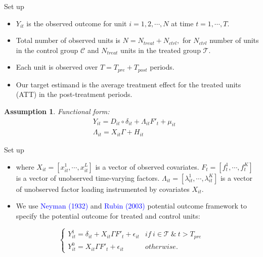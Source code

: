 \documentclass{beamer}
\newtheorem{assumption}{Assumption}
\begin{document}
\begin{frame}{Set up}
    \begin{itemize}
        \item $Y_{it}$ is the observed outcome for unit $i=1,2,\cdots, N$ at time $t=1,\cdots,T.$
        \item Total number of observed units is $N=N_{treat}+N_{ctrl},$ for $N_{ctrl}$ number of units in the control group $\mathcal{C}$ and $N_{treat}$ units in the treated group $\mathcal{T}$.
        \item Each unit is observed over $T=T_{pre}+T_{post}$ periods.
        \item Our target estimand is the average treatment effect for the treated units (ATT) in the post-treatment periods.
    \end{itemize}

\begin{assumption}
    Functional form:
    \begin{align*}
        & Y_{it} = D_{it}\circ \delta_{it} + \Lambda_{it}F'_t + \mu_{it} \\
        & \Lambda_{it} = X_{it}\Gamma + H_{it}
    \end{align*}
\end{assumption}
\end{frame}

\begin{frame}{Set up}
\begin{itemize}
    \item where $X_{it} = [x^1_{it}, \cdots, x^L_{it}]$ is a vector of observed covariates. $F_t = [f^1_t, \cdots, f^K_t]$ is a vector of unobserved time-varying factors. $\Lambda_{it} = [\lambda^1_{it}, \cdots, \lambda^K_{it}]$ is a vector of unobserved factor loading instrumented by covariates $X_{it}$.
    \item We use \textcolor{blue}{Neyman (1932)} and \textcolor{blue}{Rubin (2003)} potential outcome framework to specify the potential outcome for treated and control units:
\end{itemize}

\begin{equation*}
\begin{cases}
      Y_{it}^1 = \delta_{it} + X_{it} \Gamma F'_t + \epsilon_{it} & if \ i \in \mathcal{T} \ \& \ t > T_{pre} \\
      Y_{it}^0 = X_{it} \Gamma F'_t + \epsilon_{it} & otherwise.
\end{cases}
\end{equation*}
\end{frame}
\end{document}
